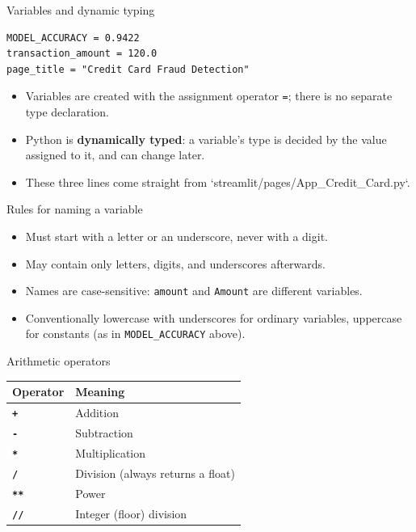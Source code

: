 \begin{frame}[fragile]{Variables and dynamic typing}
\begin{lstlisting}[style=coursepython]
MODEL_ACCURACY = 0.9422
transaction_amount = 120.0
page_title = "Credit Card Fraud Detection"
\end{lstlisting}
\begin{itemize}
\item Variables are created with the assignment operator \texttt{=}; there is no separate type declaration.
\item Python is \textbf{dynamically typed}: a variable's type is decided by the value assigned to it, and can change later.
\item These three lines come straight from `streamlit/pages/App_Credit_Card.py`.
\end{itemize}
\coursefooter
\end{frame}

\begin{frame}{Rules for naming a variable}
\begin{itemize}
\item Must start with a letter or an underscore, never with a digit.
\item May contain only letters, digits, and underscores afterwards.
\item Names are case-sensitive: \texttt{amount} and \texttt{Amount} are different variables.
\item Conventionally lowercase with underscores for ordinary variables, uppercase for constants (as in \texttt{MODEL\_ACCURACY} above).
\end{itemize}
\coursefooter
\end{frame}

\begin{frame}{Arithmetic operators}
\begin{tabularx}{\textwidth}{>{\bfseries}l X}
Operator & Meaning \\
\toprule
\texttt{+} & Addition \\
\texttt{-} & Subtraction \\
\texttt{*} & Multiplication \\
\texttt{/} & Division (always returns a float) \\
\texttt{**} & Power \\
\texttt{//} & Integer (floor) division \\
\bottomrule
\end{tabularx}
\coursefooter
\end{frame}

